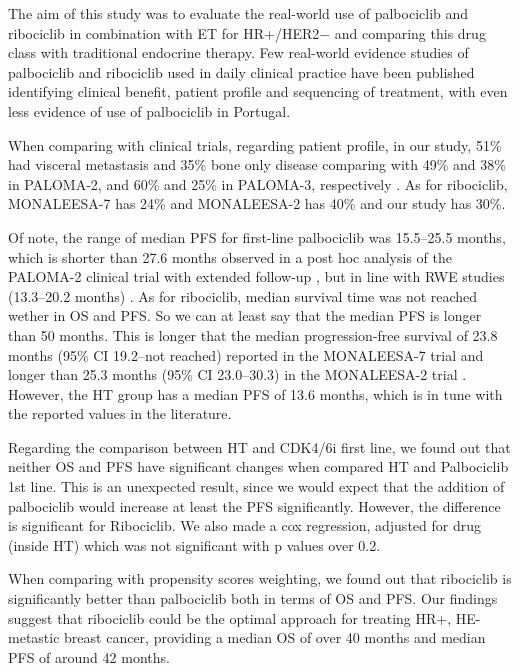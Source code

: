 The aim of this study was to evaluate the real-world use of palbociclib and ribociclib in combination with ET for HR+/HER2$-$ and comparing this drug class with traditional endocrine therapy. Few real-world evidence studies of palbociclib and ribociclib used in daily clinical practice have been published identifying clinical benefit, patient profile and sequencing of treatment, with even less evidence of use of palbociclib in Portugal.

When comparing with clinical trials, regarding patient profile, in our study, 51\% had visceral metastasis and 35\% bone only disease comparing with 49\% and 38\% in PALOMA-2, and 60\% and 25\% in PALOMA-3, respectively \cite{rugoImpactPalbociclibLetrozole2018,cristofanilliFulvestrantPalbociclibFulvestrant2016a}.
As for ribociclib, MONALEESA-7 \cite{tripathyRibociclibEndocrineTherapy2018} has 24\% and MONALEESA-2 has 40\% \cite{hortobagyiUpdatedResultsMONALEESA22018} and our study has 30\%.



Of note, the range of median PFS for first-line palbociclib was 15.5–25.5 months, which is shorter than 27.6 months observed in a post hoc analysis of the PALOMA-2 clinical trial with extended follow-up \cite{rugoImpactPalbociclibLetrozole2018}, but in line with RWE studies (13.3–20.2 months) \cite{harbeckCDK4InhibitorsHR2021}.
As for ribociclib, median survival time was not reached wether in OS and PFS. So we can at least say that the median PFS is longer than 50 months. This is longer that the median progression-free survival of 23.8 months (95\% CI 19.2–not reached) reported in the MONALEESA-7 trial \cite{tripathyRibociclibEndocrineTherapy2018} and longer than  25.3 months (95\% CI 23.0–30.3) in the MONALEESA-2 trial \cite{hortobagyiUpdatedResultsMONALEESA22018}. However, the HT group has a median PFS of 13.6 months, which is in tune with the reported values in the literature.

Regarding the comparison between HT and CDK4/6i first line, we found out that neither OS and PFS have significant changes when compared HT and Palbociclib 1st line. This is an unexpected result, since we would expect that the addition of palbociclib would increase at least the PFS significantly.
However, the difference is significant for Ribociclib. We also made a cox regression, adjusted for drug (inside HT) which was not significant with p values over 0.2.

When comparing with propensity scores weighting, we found out that ribociclib is significantly better than palbociclib both in terms of OS and PFS. Our findings suggest that ribociclib could be the optimal approach for treating HR+, HE- metastic breast cancer, providing a median OS of over 40 months and median PFS of around 42 months. 


